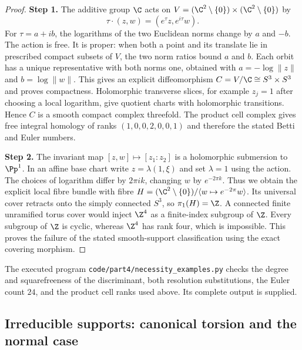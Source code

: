 \begin{proof}
\noindent\textbf{Step 1.} The additive group $\C$ acts on
$V=(\C^2\setminus\{0\})\times(\C^2\setminus\{0\})$ by
\[
 \tau\cdot(z,w)=(e^\tau z,e^{i\tau}w).
\]
For $\tau=a+ib$, the logarithms of the two Euclidean norms change
by $a$ and $-b$. The action is free. It is proper: when both a
point and its translate lie in prescribed compact subsets of $V$,
the two norm ratios bound $a$ and $b$. Each orbit has a unique
representative with both norms one, obtained with
$a=-\log\|z\|$ and $b=\log\|w\|$. This gives an explicit
diffeomorphism $C=V/\C\cong S^3\times S^3$ and proves compactness.
Holomorphic transverse slices, for example $z_j=1$ after choosing
a local logarithm, give quotient charts with holomorphic
transitions. Hence $C$ is a smooth compact complex threefold.
The product cell complex gives free integral homology of ranks
$(1,0,0,2,0,0,1)$ and therefore the stated Betti and Euler numbers.

\noindent\textbf{Step 2.} The invariant map $[z,w]\mapsto[z_1:z_2]$ is a holomorphic
submersion to $\Pp^1$. In an affine base chart write
$z=\lambda(1,\xi)$ and set $\lambda=1$ using the action.
The choices of logarithm differ by $2\pi ik$, changing $w$ by
$e^{-2\pi k}$. Thus we obtain the explicit local fibre bundle
with fibre
$H=(\C^2\setminus\{0\})/\langle w\mapsto e^{-2\pi}w\rangle$.
Its universal cover retracts onto the simply connected $S^3$, so
$\pi_1(H)=\Z$. A connected finite unramified torus cover would
inject $\Z^4$ as a finite-index subgroup of $\Z$. Every subgroup
of $\Z$ is cyclic, whereas $\Z^4$ has rank four, which is
impossible. This proves the failure of the stated smooth-support
classification using the exact covering morphism.
\end{proof}

The executed program \texttt{code/part4/necessity\_examples.py}
checks the degree and squarefreeness of the discriminant, both
resolution substitutions, the Euler count $24$, and the product
cell ranks used above. Its complete output is supplied.

\subsection{Irreducible supports: canonical torsion and the normal case}


